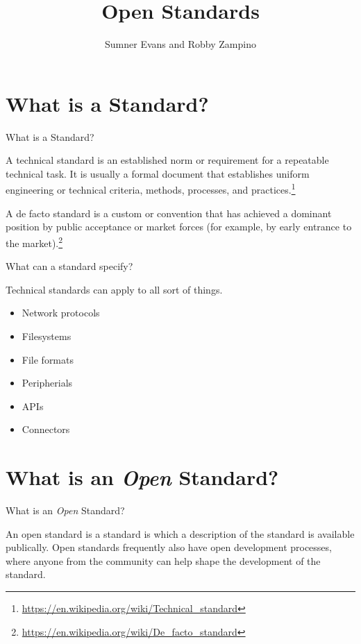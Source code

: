 \documentclass{acm}
\title{Open Standards}
\author{Sumner Evans and Robby Zampino}
\institute{Mines Linux Users Group}
\begin{document}
\section{What is a Standard?}

\begin{frame}{What is a Standard?}

        A technical standard is an established norm or requirement for a
        repeatable technical task. It is usually a formal document that
        establishes uniform engineering or technical criteria, methods,
        processes, and practices.\footnote[frame]{
        \url{https://en.wikipedia.org/wiki/Technical_standard}}

        A de facto standard is a custom or convention that has achieved a
        dominant position by public acceptance or market forces (for
        example, by early entrance to the market).\footnote[frame]{
        \url{https://en.wikipedia.org/wiki/De_facto_standard}}

\end{frame}

\begin{frame}{What can a standard specify?}

        Technical standards can apply to all sort of things.
        \begin{itemize}
                        \pause
                \item Network protocols
                        \pause
                \item Filesystems
                        \pause
                \item File formats
                        \pause
                \item Peripherials
                        \pause
                \item APIs
                        \pause
                \item Connectors
        \end{itemize}


\end{frame}

\section{What is an \textit{Open} Standard?}

\begin{frame}{What is an \textit{Open} Standard?}

        An open standard is a standard is which a description of the standard
        is available publically. Open standards frequently also have open
        development processes, where anyone from the community can help shape
        the development of the standard. 

\end{frame}
\end{document}
